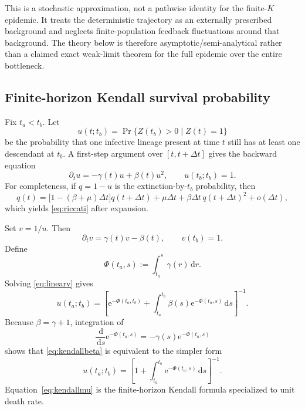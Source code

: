 \documentclass[11pt]{article}
\newcommand{\dd}{\,\mathrm d}
\newcommand{\e}{\mathrm e}
\newcommand{\gam}{\gamma}
\newcommand{\PhiB}{\Phi}
\begin{document}
This is a stochastic approximation, not a pathwise identity for the finite-\(K\) epidemic. It treats the deterministic trajectory as an externally prescribed background and neglects finite-population feedback fluctuations around that background. The theory below is therefore asymptotic/semi-analytical rather than a claimed exact weak-limit theorem for the full epidemic over the entire bottleneck.

\subsection{Finite-horizon Kendall survival probability}

Fix \(t_a<t_b\). Let
\[
u(t;t_b)=\Pr\{Z(t_b)>0\mid Z(t)=1\}
\]
be the probability that one infective lineage present at time \(t\) still has at least one descendant at \(t_b\). A first-step argument over \([t,t+\Delta t]\) gives the backward equation
\begin{equation}
\partial_t u
=-\gam(t)u+\beta(t)u^2,
\qquad
u(t_b;t_b)=1.\label{eq:riccati}
\end{equation}
For completeness, if \(q=1-u\) is the extinction-by-\(t_b\) probability, then
\[
q(t)=\bigl[1-(\beta+\mu)\Delta t\bigr]q(t+\Delta t)
+\mu\Delta t
+\beta\Delta t\,q(t+\Delta t)^2+o(\Delta t),
\]
which yields \eqref{eq:riccati} after expansion.

Set \(v=1/u\). Then
\begin{equation}
\partial_t v=\gam(t)v-\beta(t),
\qquad v(t_b)=1.\label{eq:linearv}
\end{equation}
Define
\begin{equation}
\PhiB(t_a,s):=\int_{t_a}^{s}\gam(r)\dd r.\label{eq:Phidef}
\end{equation}
Solving \eqref{eq:linearv} gives
\begin{equation}
\boxed{
 u(t_a;t_b)
 =
 \left[
 \e^{-\PhiB(t_a,t_b)}
 +\int_{t_a}^{t_b}\beta(s)\e^{-\PhiB(t_a,s)}\dd s
 \right]^{-1}.}
\label{eq:kendallbeta}
\end{equation}
Because \(\beta=\gam+1\), integration of
\[
\frac{\dd}{\dd s}\e^{-\PhiB(t_a,s)}=-\gam(s)\e^{-\PhiB(t_a,s)}
\]
shows that \eqref{eq:kendallbeta} is equivalent to the simpler form
\begin{equation}
\boxed{
 u(t_a;t_b)
 =
 \left[
 1+\int_{t_a}^{t_b}\e^{-\PhiB(t_a,s)}\dd s
 \right]^{-1}.}
\label{eq:kendallmu}
\end{equation}
Equation~\eqref{eq:kendallmu} is the finite-horizon Kendall formula specialized to unit death rate.
\end{document}

